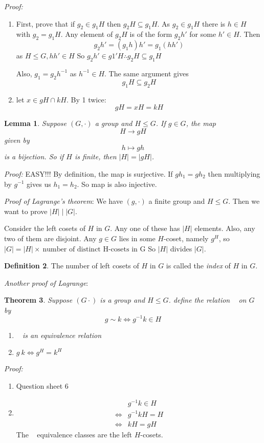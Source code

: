 \documentclass{report}
\newtheorem{theorem}{Theorem}[subsection]
\newtheorem{lemma}[theorem]{Lemma}
\theoremstyle{remark}
\theoremstyle{definition}
\newtheorem{definition}[theorem]{Definition}
\theoremstyle{definition}
\theoremstyle{theorem}
\begin{document}
\emph{Proof:}
\begin{enumerate}[label=\textcircled{\tiny{\arabic*}}]
    \item First, prove that if $g_2 \in g_1H$ then $g_2H \subseteq g_1H$. As $g_2 \in g_1H$ there is $h \in H$ with $g_2=g_1H$. Any element of $g_2H$ is of the form $g_2h'$ for some $h' \in H$. Then
    \[g_2h'=(g_1h)h'=g_1(hh')\]
    as $H \leq G, hh' \in H$ So $g_2h' \in g1'H \therefore g_2H \subseteq g_1H$ \par
    Also, $g_1=g_2h^{-1}$ as $h^{-1} \in H$. The same argument gives
    \[g_1H \subseteq g_2H\]
    \item let $x \in gH \cap kH$. By \textcircled{\tiny{1}} twice:
    \[gH=xH=kH\]
\end{enumerate}
\begin{lemma}
Suppose $(G, \cdot)$ a group and $H \leq G$. If $g \in G$, the map
\[H \rightarrow gH\]
given by
\[h \mapsto gh\]
is a bijection. So if $H$ is finite, then $|H|=|gH|$.
\end{lemma}
\emph{Proof:} EASY!!! By definition, the map is surjective. If $gh_1=gh_2$ then multiplying by $g^{-1}$ gives us $h_1=h_2$. So map is also injective.\par
\emph{Proof of Lagrange's theorem}: We have $(g, \cdot)$ a finite group and $H \leq G$. Then we want to prove $|H| \mid |G|$.\par
Consider the left cosets of $H$ in $G$. Any one of these has $|H|$ elements. Also, any two of them are disjoint. Any $g \in G$ lies in some $H$-coset, namely $g^H$, so $|G|=|H| \times \> \text{number of distinct H-cosets in G}$ So $|H|$ divides $|G|$.
\begin{definition}
The number of left cosets of $H$ in $G$ is called the \emph{index} of $H$ in $G$.
\end{definition}
\emph{Another proof of Lagrange}:
\begin{theorem}
Suppose $(G \cdot)$ is a group and $H \leq G$. define the relation ~ on $G$ by
\[g\sim k \iff g^{-1}k \in H\]
\begin{enumerate}[label=\textcircled{\tiny{\arabic*}}]
    \item ~ is an equivalence relation
    \item $g~k \iff g^H=k^H$
\end{enumerate}
\end{theorem}
\emph{Proof:}
\begin{enumerate}[label=\textcircled{\tiny{\arabic*}}]
    \item Question sheet 6
    \item \begin{align*}
        &g^{-1}k \in H\\
        \iff&g^{-1}kH=H\\
        \iff&kH=gH
    \end{align*}
    The ~ equivalence classes are the left $H$-cosets.
\end{enumerate}
\end{document}
